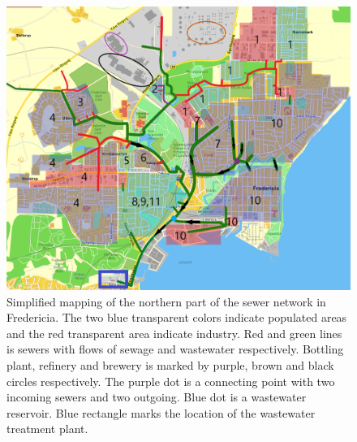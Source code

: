 \begin{figure}[H]
\centering
\includegraphics[width=1\textwidth]{report/system_overview/pictures/kloakgrid_simplified8.png}
\caption{Simplified mapping of the northern part of the sewer network in Fredericia. The two blue transparent colors indicate populated areas and the red transparent area indicate industry. Red and green lines is sewers with flows of sewage and wastewater respectively. Bottling plant, refinery and brewery is marked by purple, brown and black circles respectively. The purple dot is a connecting point with two incoming sewers and two outgoing. Blue dot is a wastewater reservoir. Blue rectangle marks the location of the wastewater treatment plant.
\cite{Krak}}
\label{fig:kloakgrid_simplified}
\end{figure}

